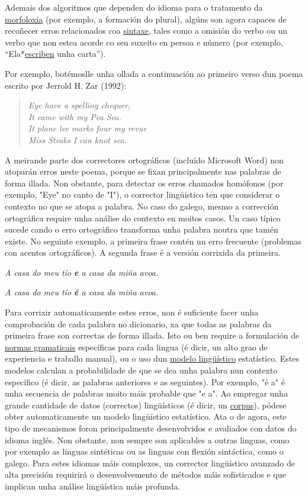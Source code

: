 \begin{multicols}{2}
Ademais dos algoritmos que dependen do idioma para o tratamento da \uline{morfoloxía} (por exemplo, a formación do plural), algúns son agora capaces de recoñecer erros relacionados coa \uline{sintaxe}, tales como a omisión do verbo ou un verbo que non estea acorde co seu suxeito en persoa e número (por exemplo, “Ela*\uline{escriben} unha carta”). 

Por exemplo, botémoslle unha ollada a continuación ao primeiro verso dun poema escrito por Jerrold H. Zar (1992): 

\begin{verse}
\textit{Eye have a spelling chequer,} \\
\textit{It came with my Pea Sea.} \\
\textit{It plane lee marks four my revue} \\
\textit{Miss Steaks I can knot sea.} 
\end{verse}

A meirande parte dos correctores ortográficos (incluído Microsoft Word) non atoparán erros neste poema, porque se fixan principalmente nas palabras de forma illada. Non obstante, para detectar os erros chamados homófonos (por exemplo, "Eye" no canto de "I"), o corrector lingüístico ten que considerar o contexto no que se atopa a palabra. No caso do galego, mesmo a corrección ortográfica require unha análise do contexto en moitos casos. Un caso típico sucede cando o erro ortográfico transforma unha palabra noutra que tamén existe. No seguinte exemplo, a primeira frase contén un erro frecuente (problemas con acentos ortográficos). A segunda frase é a versión corrixida da primeira.

\textit{A casa do meu tío \textbf{e} a casa da miña avoa.}

\textit{A casa do meu tío \textbf{é} a casa da miña avoa.} 
 
Para corrixir automaticamente estes erros, non é suficiente facer unha comprobación de cada palabra no dicionario, xa que todas as palabras da primeira frase son correctas de forma illada. Isto ou ben require a formulación de \uline{normas gramaticais} específicas para cada lingua (é dicir, un alto grao de experiencia e traballo manual), ou o uso dun \uline{modelo lingüístico} estatístico. Estes modelos calculan a probabilidade de que se dea unha palabra nun contexto específico (é dicir, as palabras anteriores e as seguintes). Por exemplo, "é a" é unha secuencia de palabras moito máis probable que "e a". Ao empregar unha grande cantidade de datos (correctos) lingüísticos (é dicir, un \uline{corpus}), pódese obter automaticamente un modelo lingüístico estatístico. Ata o de agora, este tipo de mecanismos foron principalmente desenvolvidos e avaliados con datos do idioma inglés. Non obstante, non sempre son aplicables a outras linguas, como por exemplo as linguas sintéticas ou as linguas con flexión sintáctica, como o galego. Para estes idiomas máis complexos, un corrector lingüístico avanzado de alta precisión requirirá o desenvolvemento de métodos máis sofisticados e que implican unha análise lingüística máis profunda.


\end{multicols}

